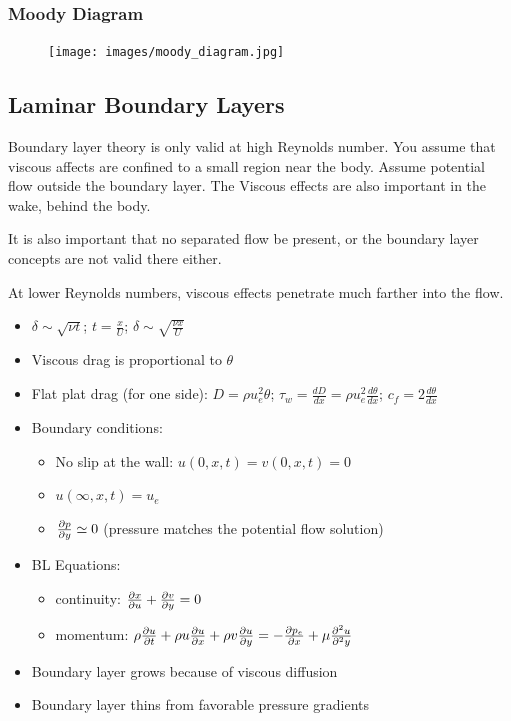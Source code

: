 \documentclass[a4paper]{article}
\begin{document}
    \subsubsection{Moody Diagram}
    \begin{figure}[H]
        \centering
        \texttt{[image: images/moody\_diagram.jpg]}
    \end{figure}

    \subsection{Laminar Boundary Layers}
    Boundary layer theory is only valid at high Reynolds number. You assume that viscous affects are confined 
    to a small region near the body. Assume potential flow outside the boundary layer. The Viscous effects are 
    also important in the wake, behind the body. 

    It is also important that no separated flow be present, or the boundary layer concepts are not valid there either.

    At lower Reynolds numbers, viscous effects penetrate much farther into the flow. 
    \begin{itemize}
        \item $\delta \sim \sqrt{\nu t}$; $t = \frac{x}{U}$; $\delta \sim \sqrt{\frac{\nu x}{U}}$
        \item Viscous drag is proportional to $\theta$
        \item Flat plat drag (for one side): $D = \rho u_e^2 \theta$; %
        $\tau_w = \frac{dD}{dx} = \rho u_e^2 \frac{d \theta}{dx}$; $c_f = 2 \frac{d\theta}{dx}$
        \item Boundary conditions: 
            \begin{itemize}
                \item No slip at the wall: $u(0,x,t) = v(0,x,t) = 0$
                \item $u(\infty, x, t) = u_e$
                \item $\frac{\partial p}{\partial y} \simeq 0$ (pressure matches the potential flow solution)
            \end{itemize}
        \item BL Equations: 
            \begin{itemize}
                \item continuity: $\frac{\partial x}{\partial u} + \frac{\partial v}{\partial y} = 0$
                \item momentum: $\rho \partderiv{u}{t} + \rho u \partderiv{u}{x} + \rho v \partderiv{u}{y} %
                = -\partderiv{p_e}{x} + \mu \partderivtwo{u}{y}$
            \end{itemize}
        \item Boundary layer grows because of viscous diffusion
        \item Boundary layer thins from favorable pressure gradients
    \end{itemize}
\end{document}
